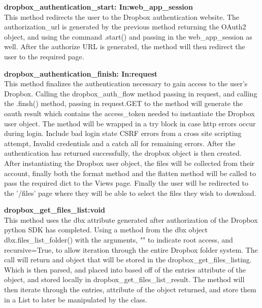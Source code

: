 \textbf{dropbox\_authentication\_start: In:web\_app\_session} \\
    This method redirects the user to the Dropbox authentication website. The authorization\_url is generated by the previous method returning 
    the OAuth2 object, and using the command .start() and passing in the web\_app\_session as well. After the authorize URL is generated, the 
    method will then redirect the user to the required page. 

\textbf{dropbox\_authentication\_finish: In:request} \\
    This method finalizes the authentication necessary to gain access to the user's Dropbox. Calling the dropbox\_auth\_flow method passing in
    request, and calling the .finsh() method, passing in request.GET to the method will generate the oauth result which contains the access\_token 
    needed to instantiate the Dropbox user object. The method will be wrapped in a try block in case http errors occur during login. Include bad login state
    CSRF errors from a cross site scripting attempt, Invalid credentials and a catch all for remaining errors. After the authentication has returned 
    successfully, the dropbox object is then created. After instantiating the Dropbox user object, the files will be collected from their account, 
    finally both the format method and the flatten method will be called to pass the required dict to the Views page. Finally the user will be redirected
    to the '/files' page where they will be able to select the files they wish to download.

\textbf{dropbox\_get\_files\_list:void} \\
    This method uses the dbx attribute generated after authorization of the Dropbox python SDK has completed. Using a method from the dbx object
    dbx.files\_list\_folder() with the arguments, "" to indicate root access, and recursive=True, to allow iteration through the entire Dropbox
    folder system. The call will return and object that will be stored in the dropbox\_get\_files\_listing. Which is then parsed, and placed into
    based off of the entries attribute of the object, and stored locally in dropbox\_get\_files\_list\_result. The method will then iterate through
    the entries, attribute of the object returned, and store them in a List to later be manipulated by the class.

